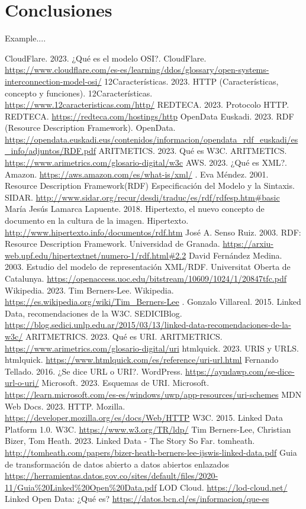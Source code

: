 \documentclass[11pt]{report}
\begin{document}
\chapter{Conclusiones}
Example....

\begin{thebibliography}{99}
	 CloudFlare. 2023.  ¿Qué es el modelo OSI?.  CloudFlare.  \url{https://www.cloudflare.com/es-es/learning/ddos/glossary/open-systems-interconnection-model-osi/}
	 12Características. 2023. HTTP (Características, concepto y funciones). 12Características. \url{https://www.12caracteristicas.com/http/}
	 REDTECA. 2023. Protocolo HTTP. REDTECA. \url{https://redteca.com/hostings/http}
	OpenData Euskadi. 2023. RDF (Resource Description Framework). OpenData. \url{https://opendata.euskadi.eus/contenidos/informacion/opendata_rdf_euskadi/es_info/adjuntos/RDF.pdf}
	 ARITMETICS. 2023. Qué es W3C. ARITMETICS. \url{https://www.arimetrics.com/glosario-digital/w3c}
	 AWS. 2023. ¿Qué es XML?. Amazon. \url{https://aws.amazon.com/es/what-is/xml/}
	.  Eva Méndez. 2001. Resource Description Framework(RDF)	Especificación del Modelo y la Sintaxis. SIDAR. \url{http://www.sidar.org/recur/desdi/traduc/es/rdf/rdfesp.htm#basic}
	 María Jesús Lamarca Lapuente. 2018. Hipertexto, el nuevo concepto de documento en la cultura de la imagen. Hipertexto. \url{http://www.hipertexto.info/documentos/rdf.htm}
	 José A. Senso Ruiz. 2003. RDF: Resource Description Framework. Universidad de Granada. \url{https://arxiu-web.upf.edu/hipertextnet/numero-1/rdf.html#2.2}
	 David Fernández Medina. 2003. Estudio del modelo de representación XML/RDF. Universitat Oberta de Catalunya. \url{https://openaccess.uoc.edu/bitstream/10609/1024/1/20847tfc.pdf}
	 Wikipedia. 2023. Tim Berners-Lee. Wikipedia. \url{https://es.wikipedia.org/wiki/Tim_Berners-Lee}
	. Gonzalo Villareal. 2015. Linked Data, recomendaciones de la W3C. SEDICIBlog. \url{https://blog.sedici.unlp.edu.ar/2015/03/13/linked-data-recomendaciones-de-la-w3c/}
	 ARITMETRICS. 2023. Qué es URI. ARITMETRICS. \url{https://www.arimetrics.com/glosario-digital/uri}
	 htmlquick. 2023. URIS y URLS. htmlquick. \url{https://www.htmlquick.com/es/reference/uri-url.html}
	 Fernando Tellado. 2016. ¿Se dice URL o URI?. WordPress. \url{https://ayudawp.com/se-dice-url-o-uri/}
	 Microsoft. 2023. Esquemas de URI. Microsoft. \url{https://learn.microsoft.com/es-es/windows/uwp/app-resources/uri-schemes}
	 MDN Web Docs. 2023. HTTP. Mozilla. \url{https://developer.mozilla.org/es/docs/Web/HTTP}
	 W3C. 2015. Linked Data Platform 1.0. W3C. \url{https://www.w3.org/TR/ldp/}
	 Tim Berners-Lee, Christian Bizer, Tom Heath. 2023. Linked Data - The Story So Far. tomheath. \url{http://tomheath.com/papers/bizer-heath-berners-lee-ijswis-linked-data.pdf}
	 Guia de transformación de datos abierto a datos abiertos enlazados \url{https://herramientas.datos.gov.co/sites/default/files/2020-11/Guia%20Linked%20Open%20Data.pdf}
	 LOD Cloud. \url{https://lod-cloud.net/}
	 Linked Open Data: ¿Qué es?	\url{https://datos.bcn.cl/es/informacion/que-es}
\end{thebibliography}
\end{document}
